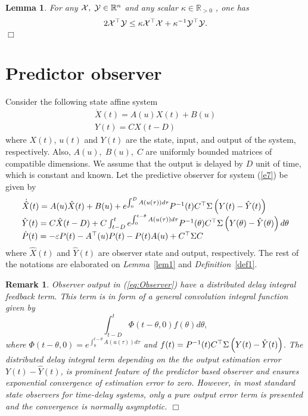 \documentclass[12pt,draftcls,onecolumn]{IEEEtran}
\newtheorem{lem}{Lemma}
\newtheorem{rem}{Remark}
\newcommand{\carrew} {\hfill $\Box$}
\begin{document}
\begin{lem} \label{young} For any  ${\cal X},\;{\cal Y} \in {\mathbb R}^{n}$ and any scalar $\kappa \in {\mathbb R}_{>0}$ , one has
\begin{equation} \label{e6}
2{{\cal X}^{\top} }{\cal Y} \le \kappa {{\cal X}^{\top} }{\cal X} + {\kappa ^{ - 1}}{{\cal Y}^{\top} }{\cal Y}.
\end{equation} \carrew
\end{lem}

\section{Predictor observer }
Consider the following state affine system
\begin{equation} \label{e7}
\begin{array}{l}
\dot X(t) = A(u)X(t) + B(u)\\
Y(t) = CX(t - D)
\end{array}
\end{equation}
where $X(t)$, $u(t)$ and $Y(t)$ are the state, input, and output of the system, respectively. Also, $ A(u),\;B(u),\;C $ are uniformly bounded matrices of compatible dimensions. We assume that the output is delayed by $D$ unit of time, which is constant and known. Let the predictive observer for system (\ref{e7}) be given by
\begin{equation}\label{eq:Observer}
\begin{array}{ll}
\dot{\hat {X}}(t) = A(u)\hat X(t) + B(u) + {e^{\int_0^D {A(u(\tau ))d\tau } }}{P^{ - 1}}(t){C^{\top} }{\rm{\Sigma }}\left( {Y(t) - \hat Y(t)} \right) \\
\hat Y(t) = C\hat X(t - D) + C\int_{t - D}^t {{e^{\int_0^{t - \theta } {A(u(\tau ))d\tau } }}{P^{ - 1}}(\theta ){C^{\top} }{\rm{\Sigma }}\left( {Y(\theta ) - \hat Y(\theta )} \right)d\theta } \\
\dot P(t) =  - \varepsilon P(t) - {A^{\top} }(u)P(t) - P(t)A(u) + {C^{\top} }{\rm{\Sigma }}C 		
\end{array}
\end{equation}
where $\hat X(t)$ and $\hat Y(t)$ are observer state and output, respectively. The rest of the notations are elaborated on \textit{Lemma}~\ref{lem1} and \textit{Definition}~\ref{def1}.



\begin{rem} \label{remphi} Observer output in (\ref{eq:Observer}) have a distributed delay integral feedback term. This term is in form of a general convolution integral function given by
\[\int_{t - D}^t {\Phi (t - \theta ,0)f(\theta )d\theta }, \]
where $ \Phi (t - \theta ,0) = {e^{\int_0^{t - \theta } {A(u(\tau ))d\tau } }} $ and $ f(t) = {P^{ - 1}}(t){C^{\top} }{\rm{\Sigma }}\left( {Y(t) - \hat Y(t)} \right) $.
The distributed delay integral term depending on the the output estimation error ${Y(t) - \hat Y(t)}$, is prominent feature of the predictor based observer and ensures exponential convergence of estimation error to zero. 
However, in most standard state observers for time-delay systems, only a pure output error term is presented and the convergence is normally asymptotic. \carrew
\end{rem}
\end{document}
